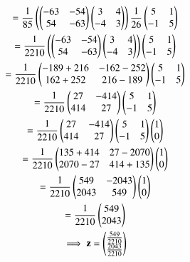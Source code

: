 \begin{multline}
 = \frac{1}{85}\brak{\myvec{-63 & -54 \\ 54 & -63} \myvec{3 & 4 \\-4 & 3}  } \frac{1}{26}\myvec{5 & 1 \\ -1 & 5}\\
 = \frac{1}{2210}\brak{\myvec{-63 & -54 \\ 54 & -63} \myvec{3 & 4 \\-4 & 3}} \myvec{5 & 1 \\ -1 & 5}\\
 = \frac{1}{2210}\myvec{-189+216 & -162-252 \\ 162+252 & 216-189}\myvec{5 & 1 \\ -1 & 5}\\
 =\frac{1}{2210}\myvec{27 & -414 \\ 414 & 27}\myvec{5 & 1 \\ -1 & 5}\\
 =\frac{1}{2210}\myvec{ 27 & -414 \\  414 & 27} \myvec{5 & 1 \\ -1 & 5}\myvec{1 \\ 0}\\
 =\frac{1}{2210}\myvec{135+414 & 27-2070 \\ 2070-27 & 414+135}\myvec{1 \\ 0}\\
 =\frac{1}{2210}\myvec{549 & -2043 \\ 2043 & 549}\myvec{1 \\ 0}\\
 =\frac{1}{2210}\myvec{549 \\ 2043}\\
 \implies\vec{z} = \myvec{\frac{549}{2210} \\ \frac{2043}{2210}}
\end{multline}

